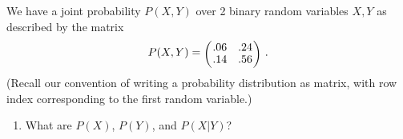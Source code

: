 %    
%
%
%
%
%




We have a joint probability $P(X,Y)$ over 2 binary random variables
$X,Y$ as described by the matrix
$$
P(X,Y)
= \mat{cc}{ .06 & .24 \\ .14 & .56} ~.
$$
(Recall our convention of writing a probability distribution as matrix, with row index corresponding to the first random variable.)

\begin{enumerate}
\item What are $P(X)$, $P(Y)$, and $P(X|Y)$?
\end{enumerate}

